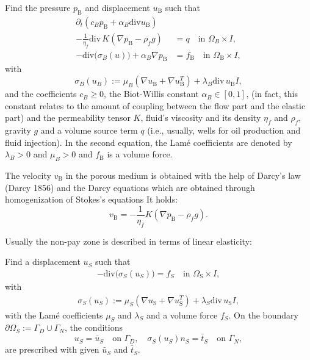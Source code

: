 \begin{Problem}
Find the pressure $p_{\text{B}}$ and displacement 
$u_{\text{B}}$ such that
\begin{align*}
\partial_t (c_B p_{\text{B}} + \alpha_B \text{div}u_{\text{B}})\\ -
\frac{1}{\eta_f} \text{div}\, K 
(\nabla p_{\text{B}} - \rho_f g) &= q \quad \text{in }\Omega_{B} \times I, \\
- \text{div}\bigl( \sigma_B (u) \bigr)
+ \alpha_B\nabla p_{\text{B}} &= f_{\text{B}} 
\quad \text{in }\Omega_{\text{B}} \times I,
\end{align*}
with
\[
\sigma_B(u_B) := \mu_B(\nabla u_{\text{B}} + \nabla u_{\text{B}}^T) +  
\lambda_B\text{div}\, u_{\text{B}}I,
\]
and the coefficients $c_B\geq 0$, 
the Biot-Willis constant $\alpha_B \in [0,1]$,
(in fact, this constant relates to the amount of 
coupling between the flow part and the elastic part) 
and the permeability tensor $K$, 
fluid's viscosity and its density 
$\eta_f$ and $\rho_f$, gravity $g$ and a volume 
source term $q$ (i.e., usually, wells for oil production and
fluid injection). In the second equation,
the Lam\'e coefficients are denoted 
by $\lambda_B >0$ and $\mu_B >0$ 
and $f_{\text{B}}$ is a volume force.
\end{Problem}

The velocity $v_{\text{B}}$ 
in the porous medium is obtained 
with the help of Darcy's law (Darcy 1856)
and the Darcy equations which are obtained 
through homogenization of Stokes's equations
It holds:
\begin{equation*}
v_{\text{B}} = -\frac{1}{\eta_f} K(\nabla p_{\text{B}} - \rho_f g).
\end{equation*}


Usually the non-pay zone is described 
in terms of linear elasticity: 
\begin{Problem}
Find 
a displacement $u_S$ such that
\begin{align*}
- \text{div}\bigl( \sigma_S (u_S)  \bigr) = f_S \quad \text{in }\Omega_{\text{S}} \times I,
\end{align*}
with
\begin{align*}
\sigma_S (u_S) := \mu_S(\nabla u_{\text{S}} + \nabla u_{\text{S}}^T) +  
\lambda_S\text{div}\, u_{\text{S}}I, 
\end{align*}
with the Lam\'e coefficients $\mu_S$ and $\lambda_S$
and a volume force $f_S$. On the boundary 
$\partial\Omega_S := \Gamma_D \cup \Gamma_N$, the 
conditions
\begin{equation*}
u_S = \bar{u}_S \quad\text{on } \Gamma_D , \quad \sigma_S (u_S) n_S = \bar{t}_S \quad\text{on } \Gamma_N,
\end{equation*}
are prescribed with given $\bar{u}_S$ and $\bar{t}_S$.
\end{Problem}

